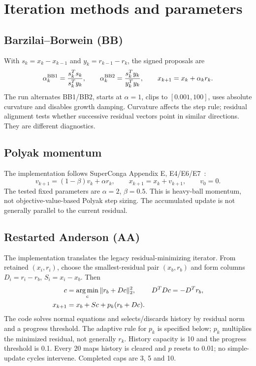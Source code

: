 \documentclass[11pt,a4paper]{article}
\begin{document}
\clearpage
\section{Iteration methods and parameters}
\subsection{Barzilai--Borwein (BB)}
With $s_k=x_k-x_{k-1}$ and $y_k=r_{k-1}-r_k$, the signed proposals are
\begin{equation}
 \alpha_k^{\rm BB1}=\frac{s_k^Ts_k}{s_k^Ty_k},\qquad
 \alpha_k^{\rm BB2}=\frac{s_k^Ty_k}{y_k^Ty_k},\qquad
 x_{k+1}=x_k+\alpha_k r_k.
\end{equation}
The run alternates BB1/BB2, starts at $\alpha=1$, clips to $[0.001,100]$,
uses absolute curvature and disables growth damping. Curvature affects the
step rule; residual alignment tests whether successive residual vectors point
in similar directions. They are different diagnostics.

\subsection{Polyak momentum}
The implementation follows SuperConga Appendix E, E4/E6/E7~\cite{superconga}:
\begin{equation}
 v_{k+1}=(1-\beta)v_k+\alpha r_k,\qquad
 x_{k+1}=x_k+v_{k+1},\qquad v_0=0.
\end{equation}
The tested fixed parameters are $\alpha=2$, $\beta=0.5$. This is heavy-ball
momentum, not objective-value-based Polyak step sizing. The accumulated update
is not generally parallel to the current residual.

\subsection{Restarted Anderson (AA)}
The implementation translates the legacy residual-minimizing iterator.
From retained $(x_i,r_i)$, choose the smallest-residual pair $(x_b,r_b)$
and form columns $D_i=r_i-r_b$, $S_i=x_i-x_b$. Then
\begin{align}
 c&=\mathop{\rm arg\,min}_c\|r_b+Dc\|_2^2,
 &D^TDc&=-D^Tr_b,\\
 x_{k+1}&=x_b+Sc+p_k(r_b+Dc).
\end{align}
The code solves normal equations and selects/discards history by residual norm
and a progress threshold. The adaptive rule for $p_k$ is specified below;
$p_k$ multiplies the minimized residual, not generally $r_k$.
History capacity is 10 and the progress threshold is 0.1. Every
20 maps history is cleared and $p$ resets to 0.01; no simple-update cycles
intervene. Completed caps are 3, 5 and 10.
\end{document}
